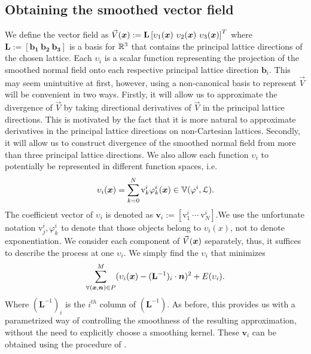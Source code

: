 \subsection{Obtaining the smoothed vector field} \label{sec:getting_vd}
\label{sec:obtainingV}
We define the vector field as $\vec{V}(\vx):=\mathbf{L} \left[\upsilon_1(\vx) \ \upsilon_2(\vx) \ \upsilon_3(\vx)\right]^T$ where $\mathbf{L := [b_1 \ b_2 \ b_3]}$ is a basis for $\realn^3$ that contains the principal lattice directions of the chosen lattice. Each $\upsilon_i$ is a scalar function representing the projection of the smoothed normal field onto each respective principal lattice direction $\mathbf{b}_i$. This may seem unintuitive at first, however, using a non-canonical basis to represent $\vec{V}$ will be convenient in two ways. Firstly, it will allow us to approximate the divergence of $\vec{V}$ by taking directional derivatives of $\vec{V}$ in the principal lattice directions. This is motivated by the fact that it is more natural to approximate derivatives in the principal lattice directions on non-Cartesian lattices. Secondly, it will allow us to construct divergence of the smoothed normal field from more than three principal lattice directions. We also allow each function $\upsilon_i$ to potentially be represented in different function spaces, i.e. {\small 
\begin{equation} 
	\upsilon_i(\vx) = \sum_{k=0}^N \text{v}_k^i \varphi_k^i(\vx) \in \aspace{\lattice{L}}{\varphi^i}.
\end{equation}}
The coefficient vector of $\upsilon_i$ is denoted as $\mathbf{v}_i:=\left[\text{v}_1^i \ \cdots \ \text{v}_N^i \right]$.We use the unfortunate notation $\text{v}_j^i, \varphi_k^i$ to denote that those objects belong to $\upsilon_i(x)$, not to denote exponentiation. We consider each component of $\vec{V}(\vx)$ separately, thus, it suffices to describe the process at one $\upsilon_i$. We simply find the $\upsilon_i$ that minimizes {\small 
\begin{equation} \label{eq:vari_eqn}
 	\sump_{\forall (\vx,\vn) \in P }^{M} (\upsilon_i(\vx) - (\mathbf{L}^{-1})_i \cdot \vect{n})^2 + E(\upsilon_i).
\end{equation} }
Where $(\mathbf{L}^{-1})_i$ is the $i^{th}$ column of $(\mathbf{L}^{-1}).$ As before, this provides us with a parametrized way of controlling the smoothness of the resulting approximation, without the need to explicitly choose a smoothing kernel. These $\mathbf{v}_i$ can be obtained using the procedure of .


